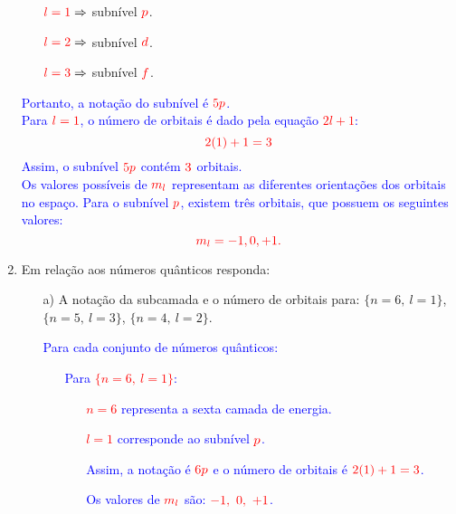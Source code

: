 \documentclass[a4paper, 12pt]{article}
\begin{document}
\begin{enumerate}
{\begin{itemize}
\begin{itemize}
				            \item[] \(\textcolor{red}{l = 1} \Rightarrow\) subnível \(\textcolor{red}{p}\).
				            \item[] \(\textcolor{red}{l = 2} \Rightarrow\) subnível \(\textcolor{red}{d}\).
				            \item[] \(\textcolor{red}{l = 3} \Rightarrow\) subnível \(\textcolor{red}{f}\).
			            \end{itemize}
		      \end{itemize}
		      \textcolor{blue}{Portanto, a notação do subnível é \(\textcolor{red}{5p}\).} \\[2mm]		      
		      \textcolor{blue}{Para \(\textcolor{red}{l = 1}\), o número de orbitais é dado pela equação \textcolor{red}{\(2l + 1\)}:}
		      \[
			      \textcolor{red}{2(1) + 1 = 3}
		      \]
		      \textcolor{blue}{Assim, o subnível \(\textcolor{red}{5p}\) contém \(\textcolor{red}{3}\) orbitais.} \\[2mm]		      
		      \textcolor{blue}{Os valores possíveis de \(\textcolor{red}{m_l}\) representam as diferentes orientações dos orbitais no espaço. Para o subnível \(\textcolor{red}{p}\), existem três orbitais, que possuem os seguintes valores:}
		      \[
			      \textcolor{red}{m_l = -1, 0, +1.}
		      \]
	      }
	\item Em relação aos números quânticos responda:
	      \begin{enumerate}
		      \item[a)] A notação da subcamada e o número de orbitais para: \(\{n = 6,\ l = 1\}\), \(\{n = 5,\ l = 3\}\), \(\{n = 4,\ l = 2\}\).
		      \item[] \textcolor{blue}{
			            Para cada conjunto de números quânticos:
			            \begin{itemize}
				            \item[] Para \textcolor{red}{\(\{n = 6,\ l = 1\}\)}:
				                  \begin{itemize}
					                  \item[] \textcolor{red}{\(n = 6\)} representa a sexta camada de energia.
					                  \item[] \textcolor{red}{\(l = 1\)} corresponde ao subnível \(\textcolor{red}{p}\).
					                  \item[] Assim, a notação é \(\textcolor{red}{6p}\) e o número de orbitais é \(\textcolor{red}{2(1)+1 = 3}\).
					                  \item[] Os valores de \(\textcolor{red}{m_l}\) são: \(\textcolor{red}{-1,\ 0,\ +1}\).

\end{itemize}
\end{itemize}}
\end{enumerate}
\end{enumerate}
\end{document}
